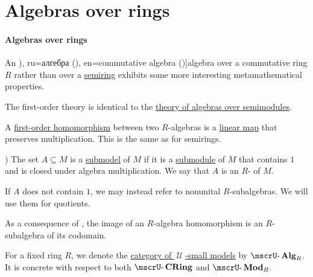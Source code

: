 \section{Algebras over rings}\label{sec:algebras_over_rings}

\paragraph{Algebras over rings}

\begin{definition}\label{def:algebra_over_ring}
  An \term[bg=алгебра (\cite[4]{КоцевСидеров2016КомутативнаАлгебра}), ru=алгебра (\cite[def. 1.7.1]{Винберг2014КурсАлгебры}), en=commutative algebra (\cite[28]{Eisenbud1995CommutativeAlgebra})]{algebra} over a commutative ring \( R \) rather than over a \hyperref[def:algebra_over_semiring]{semiring} exhibits some more interesting metamathematical properties.

  \begin{thmenum}
    \mimprovised The first-order theory is identical to the \hyperref[def:algebra_over_semiring/theory]{theory of algebras over semimodules}.

     A \hyperref[def:first_order_homomorphism]{first-order homomorphism} between two \( R \)-algebras is a \hyperref[def:linear_function]{linear map} that preserves multiplication. This is the same as for semirings.

    ) The set \( A \subseteq M \) is a \hyperref[def:first_order_submodel]{submodel} of \( M \) if it is a \hyperref[def:monoid/submodel]{submodule} of \( M \) that contains \( 1 \) and is closed under algebra multiplication. We say that \( A \) is an \( R \)- of \( M \).

    If \( A \) does not contain \( 1 \), we may instead refer to nonunital \( R \)-subalgebras. We will use them for quotients.

    As a consequence of , the image of an \( R \)-algebra homomorphism is an \( R \)-subalgebra of its codomain.

    \mimprovised For a fixed ring \( R \), we denote the \hyperref[def:category_of_small_first_order_models]{category of \( \mscrU \)-small models} by \( \ucat{Alg}_R \). It is concrete with respect to both \( \ucat{CRing} \) and \( \ucat{Mod}_R \).


\end{thmenum}
\end{definition}
